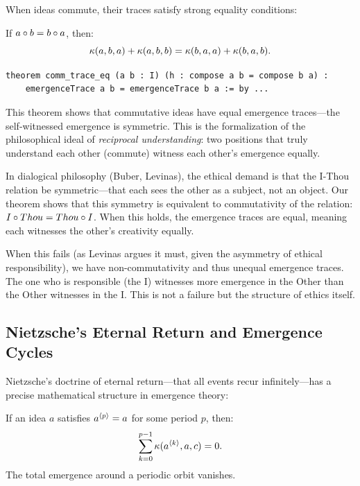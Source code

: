 When ideas commute, their traces satisfy strong equality conditions:

\begin{theorem}
\label{thm:comm-trace-eq}
If $a \circ b = b \circ a$, then:
\[
  \kappa(a, b, a) + \kappa(a, b, b) = \kappa(b, a, a) + \kappa(b, a, b).
\]
\end{theorem}

\begin{lstlisting}[caption={Trace equality (IDT\_v3\_Emergence.lean)}]
theorem comm_trace_eq (a b : I) (h : compose a b = compose b a) :
    emergenceTrace a b = emergenceTrace b a := by ...
\end{lstlisting}

\begin{interpretation}
This theorem shows that commutative ideas have equal emergence traces---the
self-witnessed emergence is symmetric. This is the formalization of the
philosophical ideal of \emph{reciprocal understanding}: two positions that
truly understand each other (commute) witness each other's emergence equally.

In dialogical philosophy (Buber, Levinas), the ethical demand is that the
I-Thou relation be symmetric---that each sees the other as a subject, not an
object. Our theorem shows that this symmetry is equivalent to commutativity of
the relation: $I \circ Thou = Thou \circ I$. When this holds, the
emergence traces are equal, meaning each witnesses the other's creativity
equally.

When this fails (as Levinas argues it must, given the asymmetry of ethical
responsibility), we have non-commutativity and thus unequal emergence traces.
The one who is responsible (the I) witnesses more emergence in the Other than
the Other witnesses in the I. This is not a failure but the structure of ethics
itself.
\end{interpretation}



\subsection{Nietzsche's Eternal Return and Emergence Cycles}

Nietzsche's doctrine of eternal return---that all events recur infinitely---has
a precise mathematical structure in emergence theory:

\begin{theorem}
\label{thm:eternal-return}
If an idea $a$ satisfies $a^{\langle p \rangle} = a$ for some period $p$, then:
\[
  \sum_{k=0}^{p-1} \kappa(a^{\langle k \rangle}, a, c) = 0.
\]
The total emergence around a periodic orbit vanishes.
\end{theorem}

